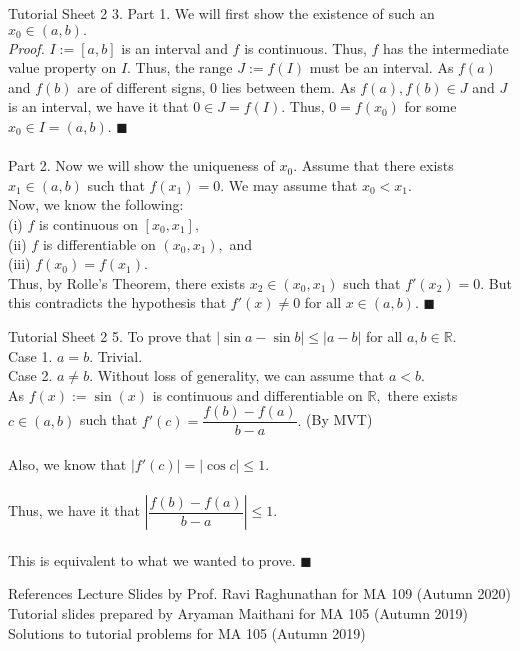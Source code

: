 \documentclass[aspectratio=169]{beamer}
\begin{document}
\begin{frame}{Tutorial Sheet 2}
	3. Part 1. We will first show the existence of such an $x_0 \in (a, b).$\\
	\emph{Proof.} $I := [a, b]$ is an interval and $f$ is continuous. Thus, $f$ has the intermediate value property on $I.$ Thus, the range $J := f(I)$ must be an interval. As $f(a)$ and $f(b)$ are of different signs, $0$ lies between them. As $f(a), f(b) \in J$ and $J$ is an interval, we have it that $0 \in J = f(I).$
	Thus, $0 = f(x_0)$ for some $x_0 \in I = (a, b).$ \hfill $\blacksquare$\\~\\
	Part 2. Now we will show the uniqueness of $x_0.$ Assume that there exists $x_1 \in (a, b)$ such that $f(x_1) = 0.$ We may assume that $x_0 < x_1.$\\
	Now, we know the following:\\
	(i) $f$ is continuous on $[x_0, x_1],$\\
	(ii) $f$ is differentiable on $(x_0, x_1),$ and\\
	(iii) $f(x_0) = f(x_1).$\\
	Thus, by Rolle's Theorem, there exists $x_2 \in (x_0, x_1)$ such that $f'(x_2) = 0.$ But this contradicts the hypothesis that $f'(x) \neq 0$ for all $x \in (a, b).$ \hfill $\blacksquare$\\
\end{frame}

\begin{frame}{Tutorial Sheet 2}
	5. To prove that $|\sin a - \sin b| \le |a - b|$ for all $a, b \in \mathbb{R}.$\\
	Case 1. $a = b.$ Trivial.\\
	Case 2. $a \neq b.$ Without loss of generality, we can assume that $a < b.$\\
	As $f(x) := \sin(x)$ is continuous and differentiable on $\mathbb{R},$ there exists $c \in (a, b)$ such that $f'(c) = \dfrac{f(b) - f(a)}{b - a}.$ \hfill (By MVT)\\~\\
	Also, we know that $|f'(c)| = |\cos c| \le 1.$\\~\\
	Thus, we have it that $\left|\dfrac{f(b) - f(a)}{b - a}\right| \le 1.$\\~\\
	This is equivalent to what we wanted to prove. \hfill $\blacksquare$
\end{frame}

\begin{frame}{References}
    Lecture Slides by Prof. Ravi Raghunathan for MA 109 (Autumn 2020) \\
    Tutorial slides prepared by Aryaman Maithani for MA 105 (Autumn 2019) \\
    Solutions to tutorial problems for MA 105 (Autumn 2019) \\
\end{frame}
\end{document}
